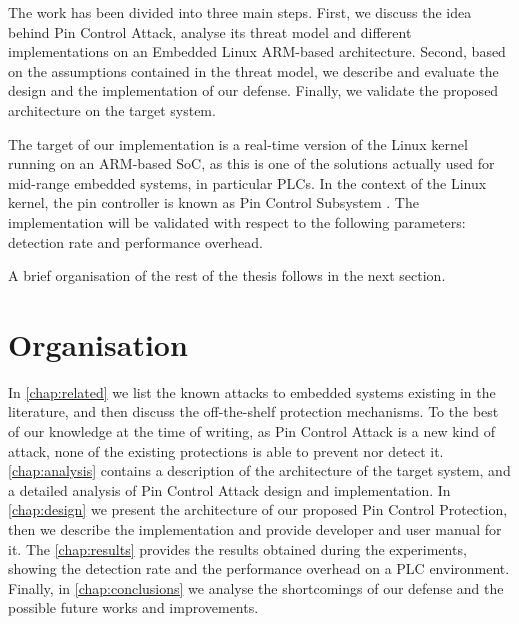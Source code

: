 The work has been divided into three main steps.
First, we discuss the idea behind Pin Control Attack, analyse its threat model and different implementations on an Embedded Linux ARM-based architecture.
Second, based on the assumptions contained in the threat model, we describe and evaluate the design and the implementation of our defense.
Finally, we validate the proposed architecture on the target system.

The target of our implementation is a real-time version of the Linux kernel running on an ARM-based SoC,
as this is one of the solutions actually used for mid-range embedded systems, in particular PLCs.
In the context of the Linux kernel, the pin controller is known as Pin Control Subsystem \cite{pinctrl}.
The implementation will be validated with respect to the following parameters: detection rate and performance overhead.

A brief organisation of the rest of the thesis follows in the next section.


\section{Organisation}

In \chap \ref{chap:related} we list the known attacks to embedded systems existing in the literature, and then discuss the off-the-shelf protection mechanisms.
To the best of our knowledge at the time of writing, as Pin Control Attack is a new kind of attack, none of the existing protections is able to prevent nor detect it.
\chap \ref{chap:analysis} contains a description of the architecture of the target system, and a detailed analysis of Pin Control Attack design and implementation.
In \chap \ref{chap:design} we present the architecture of our proposed Pin Control Protection, then we describe the implementation and provide developer and user manual for it.
The \chap \ref{chap:results} provides the results obtained during the experiments, showing the detection rate and the performance overhead on a PLC environment.
Finally, in \chap \ref{chap:conclusions} we analyse the shortcomings of our defense and the possible future works and improvements.


